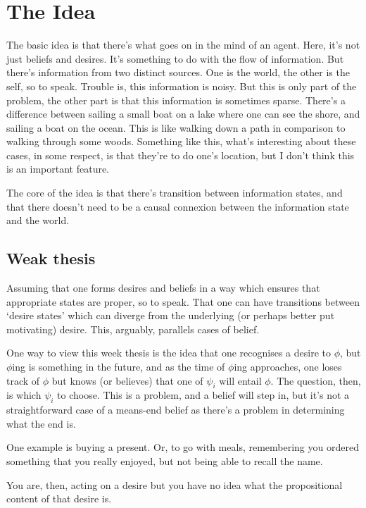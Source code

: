 \documentclass[10pt]{article}
\begin{document}
\section{The Idea}
\label{sec:idea}

The basic idea is that there's what goes on in the mind of an agent.
Here, it's not just beliefs and desires.
It's something to do with the flow of information.
But there's information from two distinct sources.
One is the world, the other is the self, so to speak.
Trouble is, this information is noisy.
But this is only part of the problem, the other part is that this information is sometimes sparse.
There's a difference between sailing a small boat on a lake where one can see the shore, and sailing a boat on the ocean.
This is like walking down a path in comparison to walking through some woods.
Something like this, what's interesting about these cases, in some respect, is that they're to do one's location, but I don't think this is an important feature.


The core of the idea is that there's transition between information states, and that there doesn't need to be a causal connexion between the information state and the world.


\subsection{Weak thesis}
\label{sec:weak-thesis}

Assuming that one forms desires and beliefs in a way which ensures that appropriate states are proper, so to speak.
That one can have transitions between `desire states' which can diverge from the underlying (or perhaps better put motivating) desire.
This, arguably, parallels cases of belief.

One way to view this week thesis is the idea that one recognises a desire to \(\phi\), but \(\phi\)ing is something in the future, and as the time of \(\phi\)ing approaches, one loses track of \(\phi\) but knows (or believes) that one of \(\psi_{i}\) will entail \(\phi\).
The question, then, is which \(\psi_{i}\) to choose.
This is a problem, and a belief will step in, but it's not a straightforward case of a means-end belief as there's a problem in determining what the end is.

One example is buying a present.
Or, to go with meals, remembering you ordered something that you really enjoyed, but not being able to recall the name.

You are, then, acting on a desire but you have no idea what the propositional content of that desire is.
\end{document}
